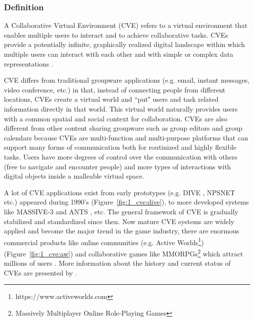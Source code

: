 \subsubsection{Definition}
A Collaborative Virtual Environment (CVE) refers to a virtual environment that enables multiple users to interact and to achieve collaborative tasks. CVEs provide a potentially infinite, graphically realized digital landscape within which multiple users can interact with each other and with simple or complex data representations \citep{Churchill1998CVE}. 

CVE differs from traditional groupware applications (e.g. email, instant messages, video conference, etc.) in that, instead of connecting people from different locations, CVEs create a virtual world and ``put" users and task related information directly in that world. This virtual world naturally provides users with a common spatial and social context for collaboration. CVEs are also different from other content sharing groupware such as group editors and group calendars because CVEs are multi-function and multi-purpose platforms that can support many forms of communication both for routinized and highly flexible tasks. Users have more degrees of control over the communication with others (free to navigate and encounter people) and more types of interactions with digital objects inside a malleable virtual space.

A lot of CVE applications exist from early prototypes (e.g. DIVE \citep{Carlsson1993DIVE}, NPSNET \citep{Macedonia1994NPSNET} etc.) appeared during 1990's (Figure~\ref{fig:1_cve:dive}), to more developed systems like MASSIVE-3 \citep{Greenhalgh2000MASSIVE} and ANTS \citep{Lopez2003ANTS}, etc. The general framework of CVE is gradually stabilized and standardized since then. Now mature CVE systems are widely applied and become the major trend in the game industry, there are enormous commercial products like online communities (e.g. Active Worlds\footnote{https://www.activeworlds.com}) (Figure~\ref{fig:1_cve:aw}) and collaborative games like MMORPGs\footnote{Massively Multiplayer Online Role-Playing Games} which attract millions of users \citep{Brown2004CSCW}. More information about the history and current status of CVEs are presented by \citet{Joslin2004CVE}.

